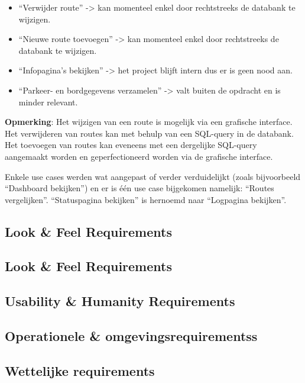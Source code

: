 \documentclass[a4paper]{article}
\begin{document}
\begin{itemize}
\item ``Verwijder route'' -> kan momenteel enkel door rechtstreeks de databank te wijzigen.
\item ``Nieuwe route toevoegen'' -> kan momenteel enkel door rechtstreeks de databank te wijzigen.
\item ``Infopagina's bekijken'' -> het project blijft intern dus er is geen nood aan.
\item ``Parkeer- en bordgegevens verzamelen'' -> valt buiten de opdracht en is minder relevant.
\end{itemize}

\textbf{Opmerking}: Het wijzigen van een route is mogelijk via een grafische interface. Het verwijderen van routes kan met behulp van een SQL-query in de databank. Het toevoegen van routes kan eveneens met een dergelijke SQL-query aangemaakt worden en geperfectioneerd worden via de grafische interface.

Enkele use cases werden wat aangepast of verder verduidelijkt (zoals  bijvoorbeeld ``Dashboard bekijken'') en er is één use case bijgekomen namelijk: ``Routes vergelijken''. ``Statuspagina bekijken'' is hernoemd naar ``Logpagina bekijken''.


\subsection{Look \& Feel Requirements}

\subsection{Look \& Feel Requirements}

\newpage

\subsection{Usability \& Humanity Requirements}

\subsection{Operationele \& omgevingsrequirementss}

\subsection{Wettelijke requirements}
\end{document}
